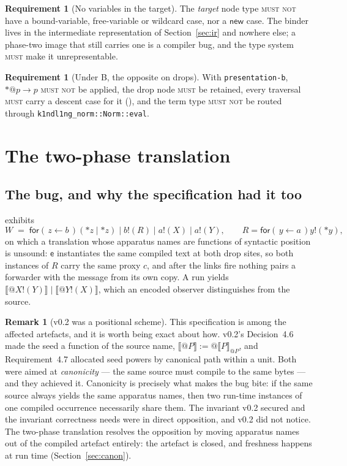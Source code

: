 \documentclass[11pt,a4paper]{article}
\makeatletter
\newcommand{\code}[1]{\texttt{#1}}
\newcommand{\MUST}{\textsc{must}}
\newcommand{\MUSTNOT}{\textsc{must not}}
\newcommand{\quo}[1]{@#1}
\newcommand{\drp}[1]{{*}#1}
\newcommand{\inp}[3]{\mathsf{for}(\,#1 \leftarrow #2\,)#3}
\newcommand{\out}[2]{#1!(#2)}
\newcommand{\enc}[1]{\llbracket #1 \rrbracket}
\newcommand{\ev}{\mathsf{e}}
\theoremstyle{definition}
\newtheorem{requirement}[definition]{Requirement}
\newtheorem{remark}[definition]{Remark}
\theoremstyle{plain}
\makeatother
\begin{document}
\begin{requirement}[No variables in the target]\label{req:novars}
The \emph{target} node type \MUSTNOT{} have a bound-variable, free-variable or
wildcard case, nor a $\mathsf{new}$ case. The binder lives in the
intermediate representation of Section~\ref{sec:ir} and nowhere else; a
phase-two image that still carries one is a compiler bug, and the type system
\MUST{} make it unrepresentable.
\end{requirement}

\begin{requirement}[Under B, the opposite on drops]\label{req:nodropB}
With \code{presentation-b}, $\drp{\quo{p}} \to p$ \MUSTNOT{} be applied, the
drop node \MUST{} be retained, every traversal \MUST{} carry a descent case
for it (\cite[Prop.~2.4(iii)]{logic}), and the term type \MUSTNOT{} be routed
through \code{k1ndl1ng\_norm::Norm::eval}.
\end{requirement}

\section{The two-phase translation}\label{sec:twophase}

\subsection{The bug, and why the specification had it too}
\label{sec:thebug}

\cite[\S6.1]{draft3} exhibits
\[
  W \;=\; \inp{z}{b}{(\drp{z} \mid \drp{z})} \mid \out{b}{R}
      \mid \out{a}{X} \mid \out{a}{Y},
  \qquad R = \inp{y}{a}{\out{y}{\drp{y}}},
\]
on which a translation whose apparatus names are functions of syntactic
position is unsound: $\ev$ instantiates the same compiled text at both drop
sites, so both instances of $R$ carry the same proxy $c$, and after the links
fire nothing pairs a forwarder with the message from its own copy. A run
yields $\enc{\out{\quo{X}}{Y}} \mid \enc{\out{\quo{Y}}{X}}$, which an encoded
observer distinguishes from the source.

\begin{remark}[v0.2 was a positional scheme]\label{rem:v2bug}
This specification is among the affected artefacts, and it is worth being
exact about how. v0.2's Decision~4.6 made the seed a function of the source
name, $\enc{\quo{P}} := \quo{\enc{P}_{\quo{P}}}$, and Requirement~4.7
allocated seed powers by canonical path within a unit. Both were aimed at
\emph{canonicity} --- the same source must compile to the same bytes --- and
they achieved it. Canonicity is precisely what makes the bug bite: if the same
source always yields the same apparatus names, then two run-time instances of
one compiled occurrence necessarily share them. The invariant v0.2 secured and
the invariant correctness needs were in direct opposition, and v0.2 did not
notice. The two-phase translation resolves the opposition by moving apparatus
names out of the compiled artefact entirely: the artefact is closed, and
freshness happens at run time (Section~\ref{sec:canon}).
\end{remark}
\end{document}
